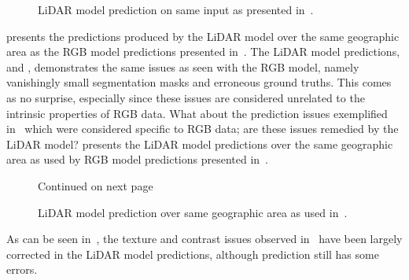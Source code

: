 \begin{figure}[H]
  \centering
  \vspace{-1em}
  \caption{%
    LiDAR model prediction on same input as presented in~.
  }%
  \label{fig:lidar-fundamental-issues}
\end{figure}
\vspace{-1em}
 presents the predictions produced by the LiDAR model over the same geographic area as the RGB model predictions presented in~.
The LiDAR model predictions,  and , demonstrates the same issues as seen with the RGB model, namely vanishingly small segmentation masks and erroneous ground truths.
This comes as no surprise, especially since these issues are considered unrelated to the intrinsic properties of RGB data.
What about the prediction issues exemplified in~ which were considered specific to RGB data; are these issues remedied by the LiDAR model?
 presents the LiDAR model predictions over the same geographic area as used by RGB model predictions presented in~. %

\begin{figure}[H]
  \centering
  \vspace{-2em}
  \caption{Continued on next page\textellipsis}
\end{figure}
\addtocounter{figure}{-1}
\begin{figure}[H]
  \addtocounter{subfigure}{1}
  \caption{%
    LiDAR model prediction over same geographic area as used in~.
  }%
  \label{fig:lidar-corrected-rgb}
\end{figure}

As can be seen in~, the texture and contrast issues observed in~ have been largely corrected in the LiDAR model predictions, although prediction  still has some errors.

